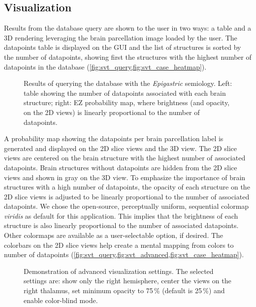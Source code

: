 \subsection{Visualization}
\label{sec:svt_visualization}

Results from the database query are shown to the user in two ways: a table and a 3D rendering leveraging the brain parcellation image loaded by the user.
The datapoints table is displayed on the \ac{GUI} and the list of structures is sorted by the number of datapoints, showing first the structures with the highest number of datapoints in the database (\cref{fig:svt_query,fig:svt_case_heatmap}).

\begin{figure}
  \centering
  \caption[Results of querying the database with the \textit{Epigastric} semiology]{
    Results of querying the database with the \textit{Epigastric} semiology.
    Left: table showing the number of datapoints associated with each brain structure;
    right: \acf{EZ} probability map, where brightness (and opacity, on the 2D views) is linearly proportional to the number of datapoints.
  }
  \label{fig:svt_query}
\end{figure}

A probability map showing the datapoints per brain parcellation label is generated and displayed on the 2D slice views and the 3D view.
The 2D slice views are centered on the brain structure with the highest number of associated datapoints.
Brain structures without datapoints are hidden from the 2D slice views and shown in gray on the 3D view.
To emphasize the importance of brain structures with a high number of datapoints, the opacity of each structure on the 2D slice views is adjusted to be linearly proportional to the number of associated datapoints.
We chose the open-source, perceptually uniform, sequential colormap \textit{viridis} as default for this application.
This implies that the brightness of each structure is also linearly proportional to the number of associated datapoints.
Other colormaps are available as a user-selectable option, if desired.
The colorbars on the 2D slice views help create a mental mapping from colors to number of datapoints (\cref{fig:svt_query,fig:svt_advanced,fig:svt_case_heatmap}).

\begin{figure}
  \centering
  \caption[Demonstration of advanced visualization settings]{
    Demonstration of advanced visualization settings.
    The selected settings are:
    show only the right hemisphere,
    center the views on the right thalamus,
    set minimum opacity to 75\,\% (default is 25\,\%)
    and enable color-blind mode.
  }
  \label{fig:svt_advanced}
\end{figure}

